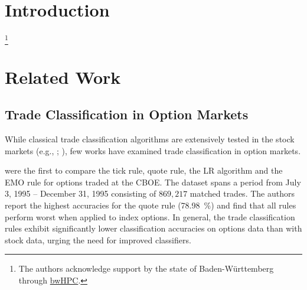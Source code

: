 
\section{Introduction}\label{sec:introduction}

\footnote{The authors acknowledge support by the state of Baden-Württemberg through \href{https://www.bwhpc.de/}{bwHPC}.}
\newpage

\section{Related Work}\label{sec:related-work}

\subsection{Trade Classification in Option Markets}
\label{sec:trade-classification-in-option-markets}

While classical trade classification algorithms are extensively tested in the stock markets (e.g., \textcite[][3806--3821]{chakrabartyTradeClassificationAlgorithms2012}; \textcite[][259--286]{odders-whiteOccurrenceConsequencesInaccurate2000}), few works have examined trade classification in option markets.

\textcite[882--883]{savickasInferringDirectionOption2003} were the first to compare the tick rule, quote rule, the \gls{LR} algorithm and the \gls{EMO} rule for options traded at the \gls{CBOE}. The dataset spans a period from July 3, 1995 -- December 31, 1995 consisting of $869{,}217$ matched trades. The authors report the highest accuracies for the quote rule (\SI{78.98}{\percent}) and find that all rules perform worst when applied to index options. In general, the trade classification rules exhibit significantly lower classification accuracies on options data than with stock data, urging the need for improved classifiers.

